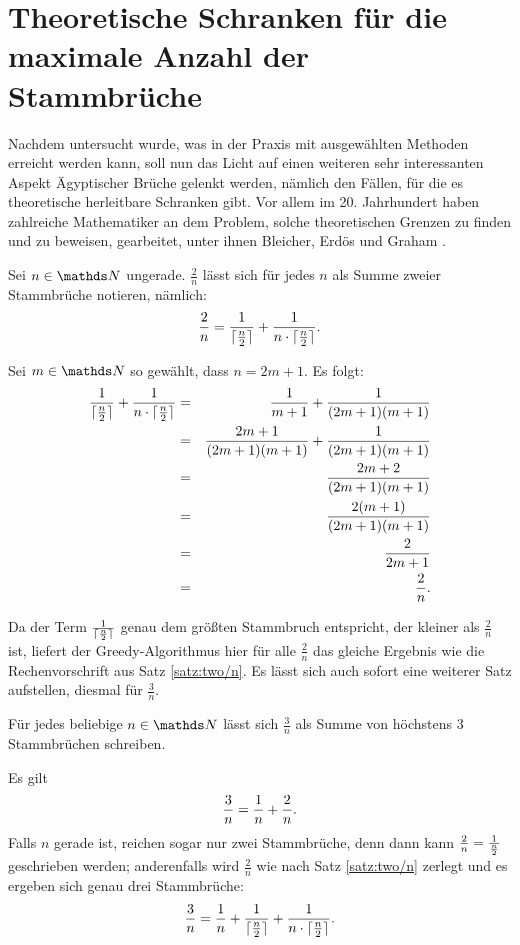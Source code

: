 \section[Theoretische Schranken]{Theoretische Schranken für die maximale Anzahl der Stammbrüche}\label{sec:theorie}
Nachdem untersucht wurde, was in der Praxis mit ausgewählten Methoden erreicht werden kann, soll nun das Licht auf einen weiteren sehr interessanten Aspekt Ägyptischer Brüche gelenkt werden, nämlich den Fällen, für die es theoretische herleitbare Schranken gibt. Vor allem im 20. Jahrhundert haben zahlreiche Mathematiker an dem Problem, solche theoretischen Grenzen zu finden und zu beweisen, gearbeitet, unter ihnen Bleicher, Erdös und Graham \cite[S.87 ff]{Guy1981}.

\begin{satz}\label{satz:two/n}
	Sei $n \in \N$ ungerade. $\frac{2}{n}$ lässt sich für jedes $n$ als Summe zweier Stammbrüche notieren, nämlich:
	$$\frac{2}{n} = \frac{1}{\lceil \frac{n}{2} \rceil} + \frac{1}{n \cdot \lceil \frac{n}{2} \rceil}.$$
\end{satz}
\begin{bew}
	Sei $m \in \N$ so gewählt, dass $n=2m+1$. Es folgt:
	{\begin{eqnarray*}
		\frac{1}{\lceil \frac{n}{2} \rceil} + \frac{1}{n \cdot \lceil \frac{n}{2} \rceil} & = & \frac{1}{m+1} + \frac{1}{(2m+1)(m+1)}\\
		& = & \frac{2m+1}{(2m+1)(m+1)} + \frac{1}{(2m+1)(m+1)}\\
		& = & \frac{2m+2}{(2m+1)(m+1)}\\
		& = & \frac{2(m+1)}{(2m+1)(m+1)}\\
		& = & \frac{2}{2m+1}\\
		& = & \frac{2}{n}.
	\end{eqnarray*}}
\end{bew}

Da der Term $\frac{1}{\lceil \frac{n}{2} \rceil}$ genau dem größten Stammbruch entspricht, der kleiner als $\frac{2}{n}$ ist, liefert der Greedy-Algorithmus hier für alle $\frac{2}{n}$ das gleiche Ergebnis wie die Rechenvorschrift aus Satz \ref{satz:two/n}. Es lässt sich auch sofort eine weiterer Satz aufstellen, diesmal für $\frac{3}{n}$.

\begin{satz}
	Für jedes beliebige $n \in \N$ lässt sich $\frac{3}{n}$ als Summe von höchstens 3 Stammbrüchen schreiben.
\end{satz}
\begin{bew}
	Es gilt
	$$\frac{3}{n} = \frac{1}{n} + \frac{2}{n}.$$
	Falls $n$ gerade ist, reichen sogar nur zwei Stammbrüche, denn dann kann $\frac{2}{n} = \frac{1}{\frac{n}{2}}$ geschrieben werden; anderenfalls wird $\frac{2}{n}$ wie nach Satz \ref{satz:two/n} zerlegt und es ergeben sich genau drei Stammbrüche:
	$$\frac{3}{n} = \frac{1}{n} + \frac{1}{\lceil \frac{n}{2} \rceil} + \frac{1}{n \cdot \lceil \frac{n}{2} \rceil}.$$
\end{bew}

